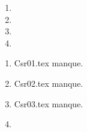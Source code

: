  
 
\begin{enumerate}
  \item  
  \item  
  \item  
  \item  
\end{enumerate} 
\clearpage 
{}
\begin{enumerate}
  \item Csr01.tex manque. 
  \item Csr02.tex manque. 
  \item Csr03.tex manque. 
  \item  
\end{enumerate} 
